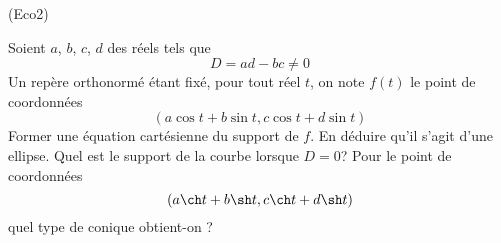 \begin{tiny}(Eco2)\end{tiny} Soient $a$, $b$, $c$, $d$ des réels tels que 
\begin{displaymath}
 D = ad - bc \neq 0
\end{displaymath}
 Un repère orthonormé étant fixé, pour tout réel $t$, on note $f(t)$ le point de coordonnées
\begin{displaymath}
 (a\cos t + b\sin t , c\cos t + d\sin t)
\end{displaymath}
Former une équation cartésienne du support de $f$. En déduire qu'il s'agit d'une ellipse. Quel est le support de la courbe lorsque $D=0$?\newline
Pour le point de coordonnées
\begin{displaymath}
 (a\ch t + b\sh t , c\ch t + d\sh t)
\end{displaymath}
quel type de conique obtient-on ?